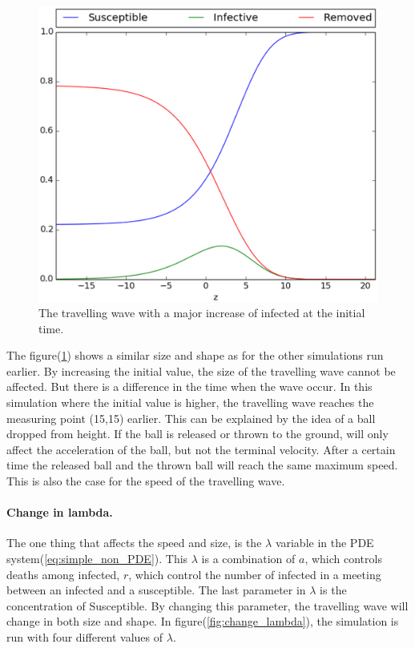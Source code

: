\documentclass[%
twoside,                 %
final,                   %
10pt]{article}
\begin{document}
\begin{figure}[ht]
  \centerline{\includegraphics[width=0.8\linewidth]{plots/TW_2D_initial_z_lambda_0_5.eps}}
  \caption{
  \label{fig:initial_trav_wave} The travelling wave with a major increase of infected at the initial time.
  }
\end{figure}


The figure(\ref{fig:initial_trav_wave}) shows a similar size and shape as for the other simulations run earlier. By increasing the initial value, the size of the travelling wave cannot be affected. But there is a difference in the time when the wave occur. In this simulation where the initial value is higher, the travelling wave reaches the measuring point (15,15) earlier. This can be explained by the idea of a ball dropped from height. If the ball is released or thrown to the ground, will only affect the acceleration of the ball, but not the terminal velocity. After a certain time the released ball and the thrown ball will reach the same maximum speed. This is also the case for the speed of the travelling wave. 
\paragraph{Change in lambda.}
The one thing that affects the speed and size, is the $\lambda$ variable in the PDE system(\ref{eq:simple_non_PDE}). This $\lambda$ is a combination of $a$, which controls deaths among infected, $r$, which control the number of infected in a meeting between an infected and a susceptible. The last parameter in $\lambda$ is the concentration of Susceptible. By changing this parameter, the travelling wave will change in both size and shape. In figure(\ref{fig:change_lambda}), the simulation is run with four different values of $\lambda$.
\end{document}
